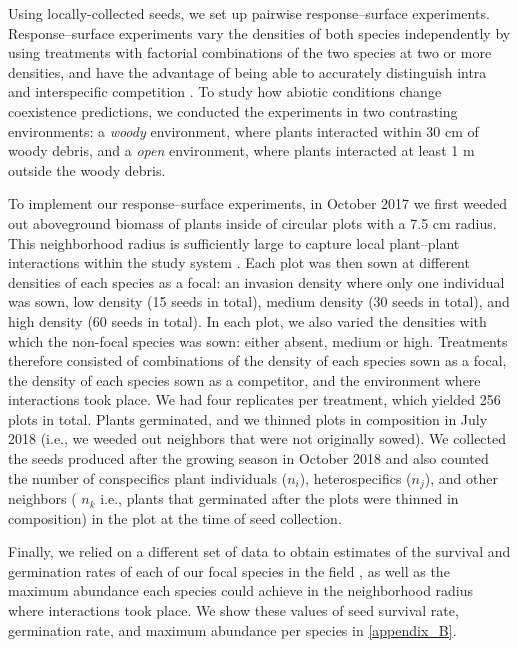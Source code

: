 \begin{refsection}
Using locally-collected seeds, we set up pairwise response--surface experiments. Response--surface experiments vary the densities of both species independently by using treatments with factorial combinations of the two species at two or more densities, and have the advantage of being able to accurately distinguish intra and interspecific competition \citep{inouye_response_2001, hart2018quantify}. To study how abiotic conditions change coexistence predictions, we conducted the experiments in two contrasting environments: a \textit{woody} environment, where plants interacted within 30 cm of woody debris, and a \textit{open} environment, where plants interacted at least 1 m outside the woody debris.

To implement our response--surface experiments, in October 2017 we first weeded out aboveground biomass of plants inside of circular plots with a 7.5 cm radius. This neighborhood radius is sufficiently large to capture local plant--plant interactions within the study system \citep{martyn2021identifying}. Each plot was then sown at different densities of each species as a focal: an invasion density where only one individual was sown, low density (15 seeds in total), medium density (30 seeds in total), and high density (60 seeds in total). In each plot, we also varied the densities with which the non-focal species was sown: either absent, medium or high. Treatments therefore consisted of combinations of the density of each species sown as a focal, the density of each species sown as a competitor, and the environment where interactions took place. We had four replicates per treatment, which yielded 256 plots in total. Plants germinated, and we thinned plots in composition in July 2018 (i.e., we weeded out neighbors that were not originally sowed). We collected the seeds produced after the growing season in October 2018 and also counted the number of conspecifics plant individuals ($n_{i}$), heterospecifics ($n_{j}$), and other neighbors ( $n_{k}$ i.e., plants that germinated after the plots were thinned in composition) in the plot at the time of seed collection.

Finally, we relied on a different set of data to obtain estimates of the survival and germination rates of each of our focal species in the field \citep{towers2021variable}, as well as the maximum abundance each species could achieve in the neighborhood radius where interactions took place. We show these values of seed survival rate, germination rate, and maximum abundance per species in \autoref{appendix_B}.


\end{refsection}
